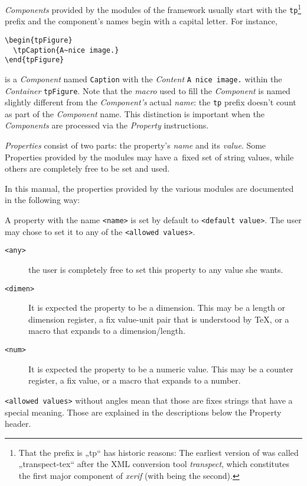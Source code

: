 \textit{Components} provided by the modules of the {\CoCoTeX}
framework usually start with the \lstinline{tp}\footnote{That the
  prefix is „tp“ has historic reasons: The earliest version of
  {\CoCoTeX} was called „transpect-tex“ after the XML conversion tool
  \textit{transpect}, which constitutes the first major component of
  \textit{xerif} (with {\CoCoTeX} being the second).} prefix and the
component's names begin with a capital letter. For instance,
\begin{lstlisting}[style=tex]
\begin{tpFigure}
  \tpCaption{A~nice image.}
\end{tpFigure}
\end{lstlisting}
is a \textit{Component} named \texttt{Caption} with the
\textit{Content} \texttt{A~nice image.} within the \textit{Container}
\texttt{tpFigure}. Note that the \textit{macro} used to fill the
\textit{Component} is named slightly different from the
\textit{Component's} actual \textit{name}: the \lstinline{tp} prefix
doesn't count as part of the \textit{Component} name. This distinction
is important when the \textit{Components} are processed via the
\textit{Property} instructions.

\textit{Properties} consist of two parts: the property's \textit{name}
and its \textit{value}. Some Properties provided by the {\CoCoTeX}
modules may have a~fixed set of string values, while others are
completely free to be set and used.

In this manual, the properties provided by the various modules are
documented in the following way:

{\let\noindex\relax{}}

A property with the name \lstinline{<name>} is set by default to
\lstinline{<default value>}. The user may chose to set it to any of
the \lstinline{<allowed values>}.
\begin{description}
\item[\texttt{<any>}]  the user is completely free to set this
  property to any value she wants.
\item[\texttt{<dimen>}] It is expected the property to be a
  dimension. This may be a length or dimension register, a fix
  value-unit pair that is understood by \TeX, or a macro that expands
  to a dimension/length.
\item[\texttt{<num>}] It is expected the property to be a numeric
  value. This may be a counter register, a fix value, or a macro that
  expands to a number.
\end{description}
\lstinline{<allowed values>} without angles mean that those are fixes
strings that have a special meaning. Those are explained in the
descriptions below the Property header.


